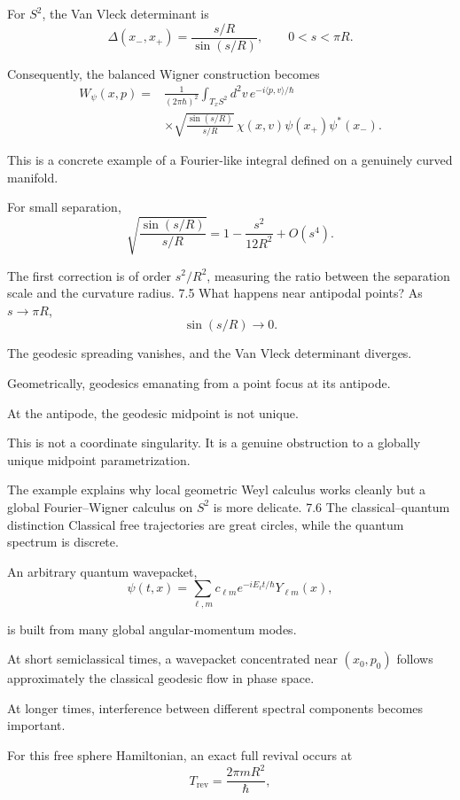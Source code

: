 For \(S^2\), the Van Vleck determinant is
\[
\boxed{
\Delta(x_-,x_+)=
\frac{s/R}{\sin(s/R)},
\qquad 0<s<\pi R.
}
\tag{78}
\]

Consequently, the balanced Wigner construction becomes
\[
\boxed{
\begin{aligned}
W_\psi(x,p)
={}&\frac1{(2\pi\hbar)^2}
\int_{T_xS^2}d^2v\,
e^{-i\langle p,v\rangle/\hbar}\\
&\times
\sqrt{\frac{\sin(s/R)}{s/R}}\,
\chi(x,v)
\psi(x_+)\psi^*(x_-).
\end{aligned}
}
\tag{79}
\]

This is a concrete example of a Fourier-like integral defined on a genuinely curved manifold.

For small separation,
\[
\sqrt{\frac{\sin(s/R)}{s/R}}
=
1-\frac{s^2}{12R^2}+O(s^4).
\tag{80}
\]

The first correction is of order \(s^2/R^2\), measuring the ratio between the separation scale and the curvature radius.
7.5 What happens near antipodal points?
As \(s\to\pi R\),
\[
\sin(s/R)\to0.
\]

The geodesic spreading vanishes, and the Van Vleck determinant diverges.

Geometrically, geodesics emanating from a point focus at its antipode.

At the antipode, the geodesic midpoint is not unique.

This is not a coordinate singularity. It is a genuine obstruction to a globally unique midpoint parametrization.

The example explains why local geometric Weyl calculus works cleanly but a global Fourier–Wigner calculus on \(S^2\) is more delicate.
7.6 The classical–quantum distinction
Classical free trajectories are great circles, while the quantum spectrum is discrete.

An arbitrary quantum wavepacket,
\[
\psi(t,x)
=
\sum_{\ell,m}c_{\ell m}
e^{-iE_\ell t/\hbar}Y_{\ell m}(x),
\tag{81}
\]

is built from many global angular-momentum modes.

At short semiclassical times, a wavepacket concentrated near \((x_0,p_0)\) follows approximately the classical geodesic flow in phase space.

At longer times, interference between different spectral components becomes important.

For this free sphere Hamiltonian, an exact full revival occurs at
\[
T_{\mathrm{rev}}=\frac{2\pi mR^2}{\hbar},
\tag{82}
\]

